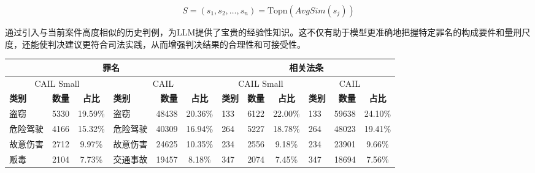 \begin{equation}
	S=(s_1​,s_2​,\dots,s_n​)=\text{Topn​}(AvgSim(s_j​))
\end{equation}

通过引入与当前案件高度相似的历史判例，为LLM提供了宝贵的经验性知识。这不仅有助于模型更准确地把握特定罪名的构成要件和量刑尺度，还能使判决建议更符合司法实践，从而增强判决结果的合理性和可接受性。


\begin{table}[!htbp]
	\centering
	\begin{tabular}{lrc|lrc|lrc|lrc}
		\hline
		\multicolumn{6}{c|}{\textbf{罪名}} & \multicolumn{6}{|c}{\textbf{相关法条}}                                                                                                                                                                                \\
		\hline
		\multicolumn{3}{c|}{CAIL Small}  & \multicolumn{3}{|c}{CAIL}          & \multicolumn{3}{|c|}{CAIL Small} & \multicolumn{3}{|c}{CAIL}                                                                                                                 \\
		\hline
		\textbf{类别}                      & \textbf{数量}                        & \textbf{占比}                      & \textbf{类别}               & \textbf{数量} & \textbf{占比} & \textbf{类别} & \textbf{数量} & \textbf{占比} & \textbf{类别} & \textbf{数量} & \textbf{占比} \\
		\hline
		盗窃                               & 5330                               & 19.59\%                          & 盗窃                        & 48438       & 20.36\%     & 133         & 6122        & 22.00\%     & 133         & 59638       & 24.10\%     \\
		危险驾驶                             & 4166                               & 15.32\%                          & 危险驾驶                      & 40309       & 16.94\%     & 264         & 5227        & 18.78\%     & 264         & 48023       & 19.41\%     \\
		故意伤害                             & 2712                               & 9.97\%                           & 故意伤害                      & 24625       & 10.35\%     & 234         & 2556        & 9.18\%      & 234         & 23901       & 9.66\%      \\
		贩毒                               & 2104                               & 7.73\%                           & 交通事故                      & 19457       & 8.18\%      & 347         & 2074        & 7.45\%      & 347         & 18694       & 7.56\%      \\

\end{tabular}
\end{table}
